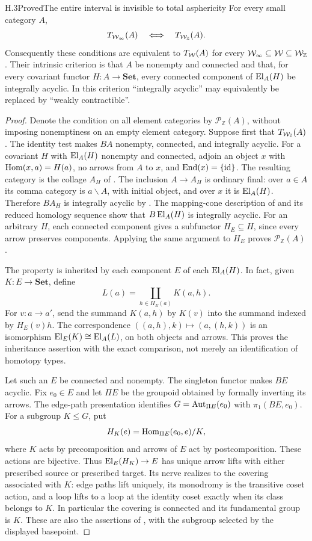 \begin{claim}{H.3}{Proved}{The entire interval is invisible to total asphericity}
For every small category $A$,
\[
 T_{\mathcal{W}_{\infty}}(A)\quad\Longleftrightarrow\quad T_{\mathcal{W}_{\mathbb Z}}(A).
\]
Consequently these conditions are equivalent to $T_{\mathcal{W}}(A)$ for every $\mathcal{W}_{\infty}\subseteq\mathcal{W}\subseteq\mathcal{W}_{\mathbb Z}$. Their intrinsic criterion is that $A$ be nonempty and connected and that, for every covariant functor $H:A\to\mathbf{Set}$, every connected component of $\operatorname{El}_A(H)$ be integrally acyclic. In this criterion ``integrally acyclic'' may equivalently be replaced by ``weakly contractible''.
\end{claim}
\begin{proof}
Denote the condition on all element categories by $\mathcal P_{\mathbb Z}(A)$, without imposing nonemptiness on an empty element category. Suppose first that $T_{\mathcal{W}_{\mathbb Z}}(A)$. The identity test makes $BA$ nonempty, connected, and integrally acyclic. For a covariant $H$ with $\operatorname{El}_A(H)$ nonempty and connected, adjoin an object $x$ with $\operatorname{Hom}(x,a)=H(a)$, no arrows from $A$ to $x$, and $\operatorname{End}(x)=\{\mathrm{id}\}$. The resulting category is the collage $A_H$ of . The inclusion $A\to A_H$ is ordinary final: over $a\in A$ its comma category is $a\backslash A$, with initial object, and over $x$ it is $\operatorname{El}_A(H)$. Therefore $BA_H$ is integrally acyclic by . The mapping-cone description of  and its reduced homology sequence show that $B\operatorname{El}_A(H)$ is integrally acyclic. For an arbitrary $H$, each connected component gives a subfunctor $H_E\subseteq H$, since every arrow preserves components. Applying the same argument to $H_E$ proves $\mathcal P_{\mathbb Z}(A)$.

The property is inherited by each component $E$ of each $\operatorname{El}_A(H)$. In fact, given $K:E\to\mathbf{Set}$, define
\[
 L(a)=\coprod_{h\in H_E(a)}K(a,h).
\]
For $v:a\to a'$, send the summand $K(a,h)$ by $K(v)$ into the summand indexed by $H_E(v)h$. The correspondence $((a,h),k)\mapsto(a,(h,k))$ is an isomorphism $\operatorname{El}_E(K)\cong\operatorname{El}_A(L)$, on both objects and arrows. This proves the inheritance assertion with the exact comparison, not merely an identification of homotopy types.

Let such an $E$ be connected and nonempty. The singleton functor makes $BE$ acyclic. Fix $e_0\in E$ and let $\Pi E$ be the groupoid obtained by formally inverting its arrows. The edge-path presentation identifies $G=\operatorname{Aut}_{\Pi E}(e_0)$ with $\pi_1(BE,e_0)$. For a subgroup $K\leq G$, put
\[
 H_K(e)=\operatorname{Hom}_{\Pi E}(e_0,e)/K,
\]
where $K$ acts by precomposition and arrows of $E$ act by postcomposition. These actions are bijective. Thus $\operatorname{El}_E(H_K)\to E$ has unique arrow lifts with either prescribed source or prescribed target. Its nerve realizes to the covering associated with $K$: edge paths lift uniquely, its monodromy is the transitive coset action, and a loop lifts to a loop at the identity coset exactly when its class belongs to $K$. In particular the covering is connected and its fundamental group is $K$. These are also the assertions of \citet[Theorem 1.38]{RootHatcher2002}, with the subgroup selected by the displayed basepoint.


\end{proof}
